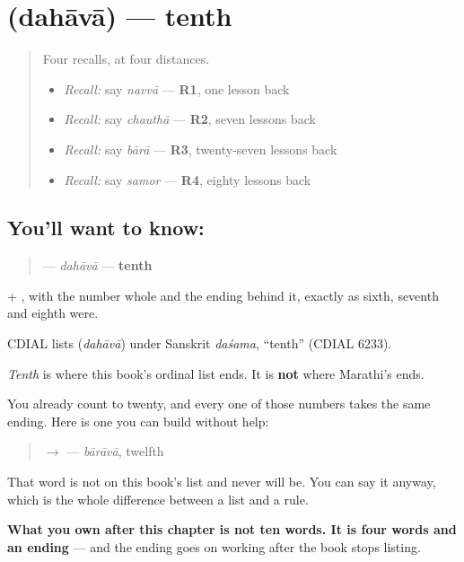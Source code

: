 \section[\texorpdfstring{\mr{दहावा} (dahāvā)}{दहावा (dahāvā)}]{ (dahāvā) — tenth}

\label{lesson:MR-C61-dahava}



\begin{quote}
Four recalls, at four distances.

\begin{itemize}
\raggedright
  \item \emph{Recall:} say \emph{navvā} — \textbf{R1}, one lesson back
  \item \emph{Recall:} say \emph{chauthā} — \textbf{R2}, seven lessons back
  \item \emph{Recall:} say \emph{bārā} — \textbf{R3}, twenty-seven lessons back
  \item \emph{Recall:} say \emph{samor} — \textbf{R4}, eighty lessons back
\end{itemize}
\end{quote}

\subsection*{You'll want to know: }
\begin{quote}
\textbf{} — \emph{dahāvā} — \textbf{tenth}
\end{quote}

\textbf{} + \textbf{}, with the number whole and the ending behind it, exactly as sixth, seventh and eighth were.

\begin{cousinweb}
CDIAL lists \textbf{} (\emph{dahāvā}) under Sanskrit \emph{daśama}, \textquotedblleft{}tenth\textquotedblright{} (CDIAL 6233).
\end{cousinweb}

\begin{grammarlens}[title={Grammar Lens: this is where the set stops, and the ending does not}]
\emph{Tenth} is where this book's ordinal list ends. It is \textbf{not} where Marathi's ends.

You already count to twenty, and every one of those numbers takes the same ending. Here is one you can build without help:

\begin{quote}
\textbf{} $\to$ \textbf{} — \emph{bārāvā}, twelfth
\end{quote}

That word is not on this book's list and never will be. You can say it anyway, which is the whole difference between a list and a rule.

\textbf{What you own after this chapter is not ten words. It is four words and an ending} — and the ending goes on working after the book stops listing.
\end{grammarlens}

